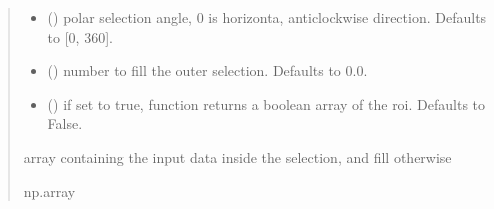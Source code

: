 \documentclass[letterpaper,10pt,english]{sphinxmanual}
\begin{document}
\begin{fulllineitems}
\begin{quote}
\begin{description}
\begin{itemize}
\item {} 
\sphinxAtStartPar
{} (\sphinxstyleliteralemphasis{\sphinxupquote{, }}) \textendash{} polar selection angle, 0 is horizonta, anti\sphinxhyphen{}clockwise direction. Defaults to {[}0, 360{]}.

\item {} 
\sphinxAtStartPar
{} (\sphinxstyleliteralemphasis{\sphinxupquote{, }}) \textendash{} number to fill the outer selection. Defaults to 0.0.

\item {} 
\sphinxAtStartPar
{} (\sphinxstyleliteralemphasis{\sphinxupquote{, }}) \textendash{} if set to true, function returns a boolean array of the roi. Defaults to False.

\end{itemize}

\sphinxAtStartPar
array containing the input data inside the selection, and fill otherwise

\sphinxAtStartPar
np.array

\end{description}\end{quote}

\end{fulllineitems}


\begin{fulllineitems}
\label{\detokenize{micropolarray.processing:micropolarray.processing.nrgf.sigmoid}}
\pysigstartsignatures
{}
\pysigstopsignatures
\end{fulllineitems}
\end{document}

